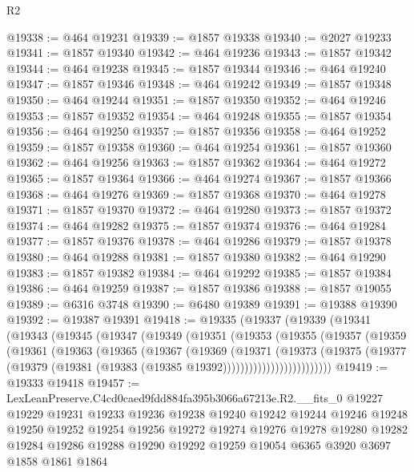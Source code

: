\begin{lexlean}{R2}
\begin{coremodule}
@19338 := @464 @19231
@19339 := @1857 @19338
@19340 := @2027 @19233
@19341 := @1857 @19340
@19342 := @464 @19236
@19343 := @1857 @19342
@19344 := @464 @19238
@19345 := @1857 @19344
@19346 := @464 @19240
@19347 := @1857 @19346
@19348 := @464 @19242
@19349 := @1857 @19348
@19350 := @464 @19244
@19351 := @1857 @19350
@19352 := @464 @19246
@19353 := @1857 @19352
@19354 := @464 @19248
@19355 := @1857 @19354
@19356 := @464 @19250
@19357 := @1857 @19356
@19358 := @464 @19252
@19359 := @1857 @19358
@19360 := @464 @19254
@19361 := @1857 @19360
@19362 := @464 @19256
@19363 := @1857 @19362
@19364 := @464 @19272
@19365 := @1857 @19364
@19366 := @464 @19274
@19367 := @1857 @19366
@19368 := @464 @19276
@19369 := @1857 @19368
@19370 := @464 @19278
@19371 := @1857 @19370
@19372 := @464 @19280
@19373 := @1857 @19372
@19374 := @464 @19282
@19375 := @1857 @19374
@19376 := @464 @19284
@19377 := @1857 @19376
@19378 := @464 @19286
@19379 := @1857 @19378
@19380 := @464 @19288
@19381 := @1857 @19380
@19382 := @464 @19290
@19383 := @1857 @19382
@19384 := @464 @19292
@19385 := @1857 @19384
@19386 := @464 @19259
@19387 := @1857 @19386
@19388 := @1857 @19055
@19389 := @6316 @3748
@19390 := @6480 @19389
@19391 := @19388 @19390
@19392 := @19387 @19391
@19418 := @19335
    (@19337
      (@19339
        (@19341
          (@19343
            (@19345
              (@19347
                (@19349
                  (@19351
                    (@19353
                      (@19355
                        (@19357
                          (@19359
                            (@19361
                              (@19363
                                (@19365
                                  (@19367
                                    (@19369
                                      (@19371
                                        (@19373
                                          (@19375
                                            (@19377
                                              (@19379
                                                (@19381
                                                  (@19383 (@19385 @19392)))))))))))))))))))))))))
@19419 := @19333 @19418
@19457 := LexLeanPreserve.C4cd0caed9fdd884fa395b3066a67213e.R2.__fits_0
    @19227
    @19229
    @19231
    @19233
    @19236
    @19238
    @19240
    @19242
    @19244
    @19246
    @19248
    @19250
    @19252
    @19254
    @19256
    @19272
    @19274
    @19276
    @19278
    @19280
    @19282
    @19284
    @19286
    @19288
    @19290
    @19292
    @19259
    @19054
    @6365
    @3920
    @3697
    @1858
    @1861
    @1864

\end{coremodule}
\end{lexlean}
